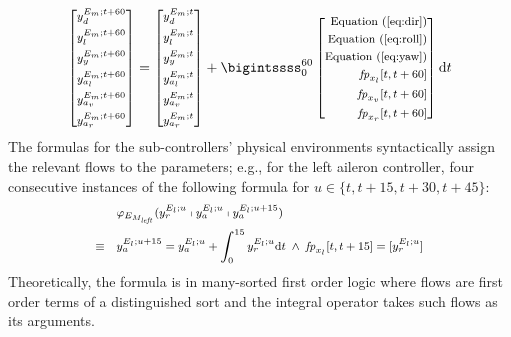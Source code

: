 \documentclass{sig-alternate}
\begin{document}
\[
\left[
\begin{medsize}
\begin{aligned}
y_d^{E_m;t+60}\\ 
y_l^{E_m;t+60}\\
y_y^{E_m;t+60}\\
y_{a_l}^{E_m;t+60}\\
y_{a_v}^{E_m;t+60}\\
y_{a_r}^{E_m;t+60}
\end{aligned}
\end{medsize}
\right]
=
\left[
\begin{medsize}
\begin{aligned}
y_d^{E_m;t}\\ 
y_l^{E_m;t}\\
y_y^{E_m;t}\\
y_{a_l}^{E_m;t}\\
y_{a_v}^{E_m;t}\\
y_{a_r}^{E_m;t}
\end{aligned}
\end{medsize}
\right]
+
\bigintssss_{0}^{60}
\left[
\begin{medsize}
\begin{aligned}
\mathrm{Equation~(\ref{eq:dir})}
\\
\mathrm{Equation~(\ref{eq:roll})}
\\
\mathrm{Equation~(\ref{eq:yaw})}
 \\
\mathit{fp}_{x_l}{[t,t+60]}
\\
\mathit{fp}_{x_v}{[t,t+60]}
\\
\mathit{fp}_{x_r}{[t,t+60]}
\end{aligned}
\end{medsize}
\right]
\mathrm{d}t
\]
The formulas for the sub-controllers' physical environments
syntactically assign the relevant flows  to the parameters;
e.g., for the left aileron controller, four consecutive instances of the following formula 
for $u \in \{t, t + 15, t + 30, t + 45\}$:
\[
\begin{medsize}
\begin{aligned}
&
\varphi_{E_{M_\mathit{left}}}(y_{r}^{E_l;u} \shortmid y_{a}^{E_l;u} \shortmid y_{a}^{E_l;u + 15})
\\ 
\equiv\quad&
y_{a}^{E_l;u + 15} = y_{a}^{E_l;u} + \int_{0}^{15} y_{r}^{E_l;u} \mathrm{d}t
\;\wedge\;
\mathit{fp}_{x_l}{[t,t+15]} = [y_{r}^{E_l;u}]
\end{aligned}
\end{medsize}
\]
Theoretically, 
the formula is in many-sorted first order logic
where flows are first order terms of a distinguished sort
and the integral operator takes such flows as its arguments.
\end{document}
